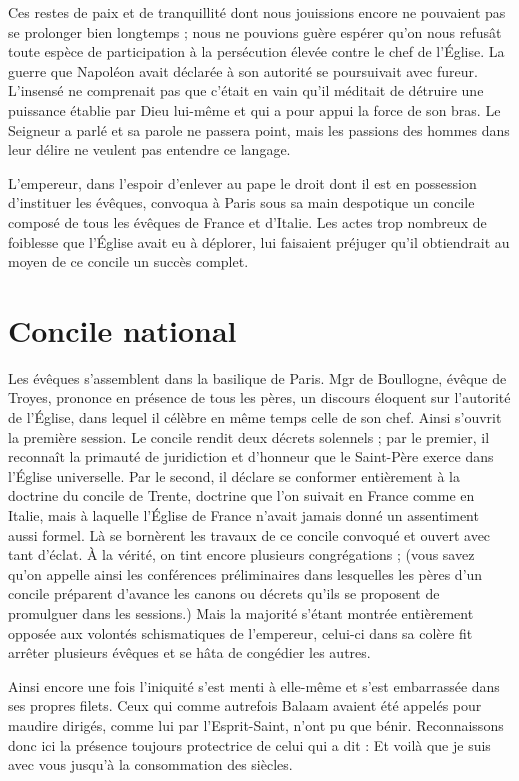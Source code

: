 Ces restes de paix et de tranquillité dont nous jouissions encore ne pouvaient pas se prolonger bien longtemps ; nous ne pouvions guère espérer qu'on nous refusât toute espèce de participation à la persécution élevée contre le chef de l'Église. La guerre que Napoléon avait déclarée à son autorité se poursuivait avec fureur. L'insensé ne comprenait pas que c'était en vain qu'il méditait de détruire une puissance établie par Dieu lui-même et qui a pour appui la force de son bras. Le Seigneur a parlé et sa parole ne passera point, mais les passions des hommes dans leur délire ne veulent pas entendre ce langage.

L'empereur, dans l'espoir d'enlever au pape le droit dont il est en possession d'instituer les évêques, convoqua à Paris sous sa main despotique un concile composé de tous les évêques de France et d'Italie. Les actes trop nombreux de foiblesse que l'Église avait eu à déplorer, lui faisaient préjuger qu'il obtiendrait au moyen de ce concile un succès complet.
\section*{Concile national}
Les évêques s'assemblent dans la basilique de Paris. Mgr de Boullogne, évêque de Troyes, prononce en présence de tous les pères, un discours éloquent sur l'autorité de l'Église, dans lequel il célèbre en même temps celle de son chef. Ainsi s'ouvrit la première session. Le concile rendit deux décrets solennels ; par le premier, il reconnaît la primauté de juridiction et d'honneur que le Saint-Père exerce dans l'Église universelle. Par le second, il déclare se conformer entièrement à la doctrine du concile de Trente, doctrine que l'on suivait en France comme en Italie, mais à laquelle l'Église de France n'avait jamais donné un assentiment aussi formel. Là se bornèrent les travaux de ce concile convoqué et ouvert avec tant d'éclat. À la vérité, on tint encore plusieurs congrégations ; (vous savez qu'on appelle ainsi les conférences préliminaires dans lesquelles les pères d'un concile préparent d'avance les canons ou décrets qu'ils se proposent de promulguer dans les sessions.) Mais la majorité s'étant montrée entièrement opposée aux volontés schismatiques de l'empereur, celui-ci dans sa colère fit arrêter plusieurs évêques et se hâta de congédier les autres.

Ainsi encore une fois l'iniquité s'est menti à elle-même et s'est embarrassée dans ses propres filets. Ceux qui comme autrefois Balaam avaient été appelés pour maudire dirigés, comme lui par l'Esprit-Saint, n'ont pu que bénir. Reconnaissons donc ici la présence toujours protectrice de celui qui a dit : Et voilà que je suis avec vous jusqu'à la consommation des siècles.

